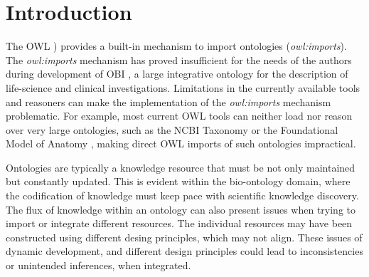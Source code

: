\documentclass[a4paper,10pt,twocolumn]{article}
\newcommand{\protege}{Prot\'{e}g\'{e}}
\begin{document}
\section*{Introduction}
\label{intro}
The \ac{OWL} \cite{RefWorks:1506}) provides a built-in mechanism to import ontologies (\emph{owl:imports}).
The \emph{owl:imports} mechanism has proved insufficient for the needs of the authors during development of \ac{OBI} \cite{RefWorks:1507}, a large integrative ontology for the description of life-science and clinical investigations.
Limitations in the currently available tools and reasoners can make the implementation of the \emph{owl:imports} mechanism problematic.
For example, most current OWL tools can neither load nor reason over very large ontologies, such as the NCBI Taxonomy \cite{RefWorks:1502} or the Foundational Model of Anatomy \cite{RefWorks:1558}, making direct \ac{OWL} imports of such ontologies impractical.




Ontologies are typically a knowledge resource that must be not only maintained but constantly updated.
This is evident within the bio-ontology domain, where the codification of knowledge must keep pace with scientific knowledge discovery.
The flux of knowledge within an ontology can also present issues when trying to import or integrate different resources.
The individual resources may have been constructed using different desing principles, which may not align.
These issues of dynamic development, and different design principles could lead to inconsistencies or unintended inferences, when integrated.
\end{document}
